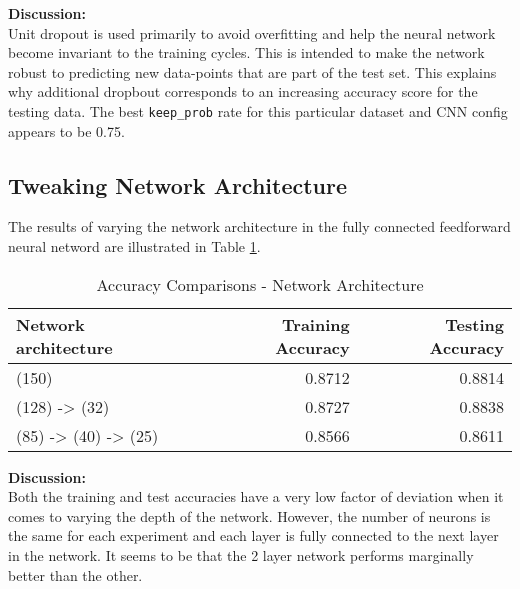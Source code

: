 \documentclass[parskip=half]{scrartcl}
\begin{document}
        \textbf{Discussion:}\\
        Unit dropout is used primarily to avoid overfitting and help the neural network become invariant to the training cycles. This is intended to make the network robust to predicting new data-points that are part of the test set. This explains why additional dropbout corresponds to an increasing accuracy score for the testing data. The best \texttt{keep\_prob} rate for this particular dataset and CNN config appears to be 0.75.

    

    \subsection{Tweaking Network Architecture} %
    \label{sub:tweaking_network_architecture}

        The results of varying the network architecture in the fully connected feedforward neural netword are illustrated in Table \ref{tab:accuracy_comparisons_network_architecture}.

        \begin{table}[th]
            \centering
            \begin{tabular}{| l | r | r |}
            \hline
            \textbf{Network architecture} & \textbf{Training Accuracy} & \textbf{Testing Accuracy} \\
            \hline
                \hline
                (150) & 0.8712 & 0.8814 \\
                \hline
                (128) -> (32) & 0.8727 & 0.8838 \\
                \hline
                (85) -> (40) -> (25) & 0.8566 & 0.8611 \\
            \hline
            \end{tabular}
            \caption{Accuracy Comparisons - Network Architecture}
            \label{tab:accuracy_comparisons_network_architecture}
        \end{table}

        \textbf{Discussion:}\\
        Both the training and test accuracies have a very low factor of deviation when it comes to varying the depth of the network. However, the number of neurons is the same for each experiment and each layer is fully connected to the next layer in the network. It seems to be that the 2 layer network performs marginally better than the other. 
    
\end{document}
